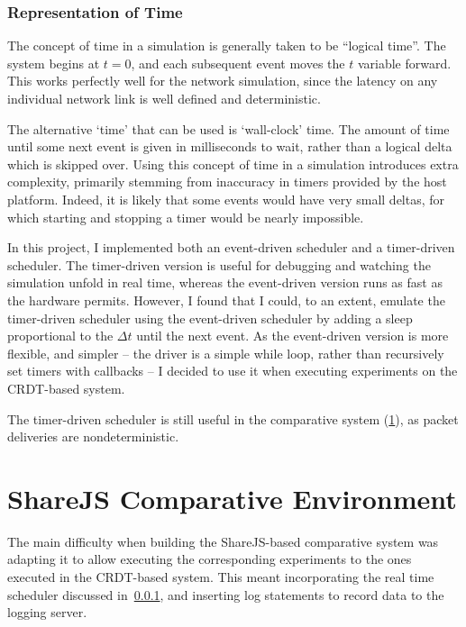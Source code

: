 \documentclass[12pt,a4paper,twoside,openright]{report}
\begin{document}
		\subsubsection{Representation of Time} \label{sec:rtscheduler}
		The concept of time in a simulation is generally taken to be ``logical time''. The system begins at $t = 0$, and each subsequent event moves the $t$ variable forward. This works perfectly well for the network simulation, since the latency on any individual network link is well defined and deterministic.
		
		The alternative `time' that can be used is `wall-clock' time. The amount of time until some next event is given in milliseconds to wait, rather than a logical delta which is skipped over. Using this concept of time in a simulation introduces extra complexity, primarily stemming from inaccuracy in timers provided by the host platform. Indeed, it is likely that some events would have very small deltas, for which starting and stopping a timer would be nearly impossible. 
		
		In this project, I implemented both an event-driven scheduler and a timer-driven scheduler. The timer-driven version is useful for debugging and watching the simulation unfold in real time, whereas the event-driven version runs as fast as the hardware permits. However, I found that I could, to an extent, emulate the timer-driven scheduler using the event-driven scheduler by adding a sleep proportional to the $\Delta t$ until the next event. As the event-driven version is more flexible, and simpler -- the driver is a simple while loop, rather than recursively set timers with callbacks -- I decided to use it when executing experiments on the CRDT-based system.
		
		The timer-driven scheduler is still useful in the comparative system (\cref{sec:comparative}), as packet deliveries are nondeterministic.
			
			
\section{ShareJS Comparative Environment} \label{sec:comparative}

	The main difficulty when building the ShareJS-based comparative system was adapting it to allow executing the corresponding experiments to the ones executed in the CRDT-based system. This meant incorporating the real time scheduler discussed in~\cref{sec:rtscheduler}, and inserting log statements to record data to the logging server.
	
\end{document}
